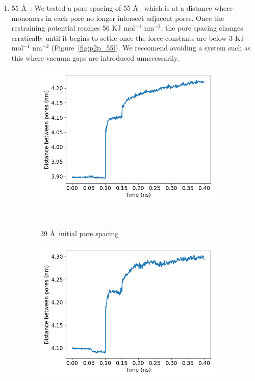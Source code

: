 \documentclass{article}
\begin{document}
\begin{enumerate}
\begin{enumerate}
		\item 55 \AA~: We tested a pore spacing of 55 \AA~ which is at
		a distance where monomers in each pore no longer intersect adjacent pores. Once
		the restraining potential reaches 56 KJ mol$^{-1}$ nm$^{-2}$, the pore spacing
		changes erratically until it begins to settle once the force constants are
		below 3 KJ mol$^{-1}$ nm$^{-2}$ (Figure~\ref{fig:p2p_55}). We reccomend
		avoiding a system such as this where vacuum gaps are introduced unnecessarily.

	  \end{enumerate} 

  	  \begin{figure}[htp]
		\centering
		\begin{subfigure}{0.3\textwidth}
			\includegraphics[width=\textwidth]{p2p_39.png}\quad
			\vspace{-1.25em}
			\caption{39 \AA~initial pore spacing}~\label{fig:p2p_39}
		\end{subfigure}
		\begin{subfigure}{0.3\textwidth}
			\includegraphics[width=\textwidth]{p2p_41.png}\quad

\end{subfigure}
\end{figure}
\end{enumerate}
\end{document}
